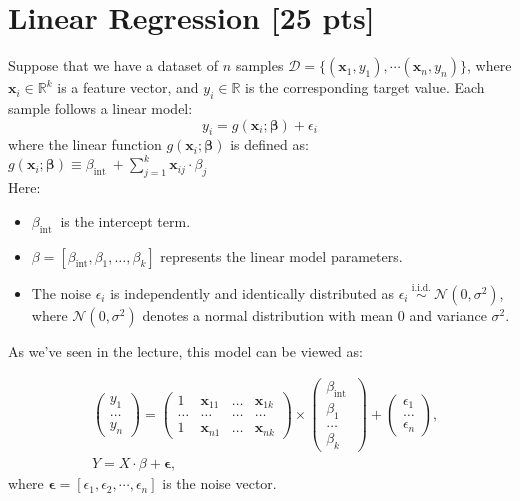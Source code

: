 \documentclass[11pt]{article}
\renewcommand{\vec}[1]{\mathbf{#1}}
\begin{document}
\section{Linear Regression [25 pts]}
Suppose that we have a dataset of $n$ samples $\mathcal{D}=\{(\mathbf{x}_1, y_1), \cdots (\mathbf{x}_n, y_n)\}$, where $\mathbf{x}_i\in \mathbb{R}^k$ is a feature vector, and $y_i\in \mathbb{R}$ is the corresponding target value. Each sample follows a linear model:
\[y_i=g(\mathbf{x}_i ; \vec{\beta})+\epsilon_i\]
where the linear function $g(\mathbf{x}_i ; \vec{\beta})$ is defined as:
\(g(\mathbf{x}_i ; \vec{\beta}) \equiv \beta_{\text {int }}+\sum_{j=1}^k \mathbf{x}_{ij} \cdot \beta_j
\)\\
Here:
\begin{itemize}
    \item $\beta_{\text {int }}$ is the intercept term.
\item ${\beta}=[\beta_{\mathrm{int}}, \beta_1, \ldots, \beta_k]$ represents the linear model parameters.
\item The noise  $\epsilon_i$ is independently and identically distributed as $\epsilon_i \stackrel{\text { i.i.d. }}{\sim} \mathcal{N}\left(0, \sigma^2\right)$, where $\mathcal{N}\left(0, \sigma^2\right)$ denotes a normal distribution with mean 0 and variance $\sigma^2$.
\end{itemize}

As we've seen in the lecture, this model can be viewed as:

\begin{align}
& \left(\begin{array}{c}
y_1 \\
\ldots \\
y_n
\end{array}\right)=\left(\begin{array}{cccc}
1 & \mathbf{x}_{11} & \ldots & \mathbf{x}_{1 k} \\
\ldots & \ldots & \ldots & \ldots \\
1 & \mathbf{x}_{n 1} & \ldots & \mathbf{x}_{n k}
\end{array}\right) \times\left(\begin{array}{c}
\beta_{\text {int }} \\
\beta_1 \\
\ldots \\
\beta_k
\end{array}\right)+\left(\begin{array}{c}
\epsilon_1 \\
\ldots \\
\epsilon_n
\end{array}\right), \\
& Y=X \cdot \beta +\boldsymbol{\epsilon},
\end{align}
where $\boldsymbol{\epsilon}=[\epsilon_1,\epsilon_2,\cdots, \epsilon_n]$ is the noise vector.
\end{document}
